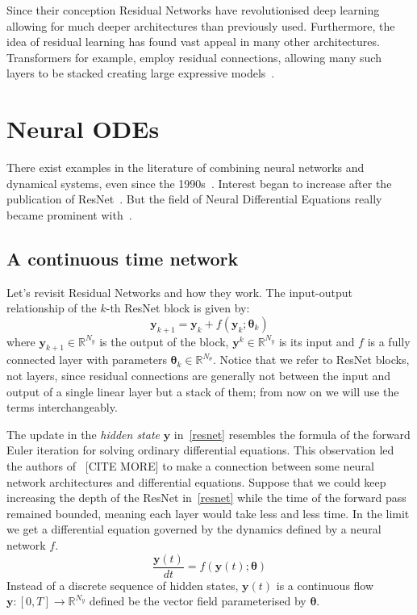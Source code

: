 \documentclass{article}
\begin{document}
    Since their conception Residual Networks have revolutionised deep learning allowing for much deeper architectures than previously used.
    Furthermore, the idea of residual learning has found vast appeal in many other architectures.
    Transformers for example, employ residual connections, allowing many such layers to be stacked creating large expressive models~\cite{vaswani2017attention}.


    \section{Neural ODEs}
    There exist examples in the literature of combining neural networks and dynamical systems, even since the 1990s~\cite{rico1992discrete}.
    Interest began to increase after the publication of ResNet~\cite{weinan2018mean}.
    But the field of Neural Differential Equations really became prominent with~\cite{chen2018neural}.

    \subsection{A continuous time network}
    Let's revisit Residual Networks and how they work.
    The input-output relationship of the $k$-th ResNet block is given by:
    \begin{equation}
        \pmb{y}_{k+1} = \pmb{y}_{k} + f(\pmb{y}_{k}; \pmb{\theta}_k) \label{resnet}
    \end{equation}
    where $\pmb{y}_{k+1} \in \mathbb{R}^{N_y}$ is the output of the block, $\pmb{y}^{k} \in \mathbb{R}^{N_y}$ is its input and $f$ is a fully connected layer with parameters $\pmb{\theta}_k \in \mathbb{R}^{N_\theta}$.
    Notice that we refer to ResNet blocks, not layers, since residual connections are generally not between the input and output of a single linear layer but a stack of them; from now on we will use the terms interchangeably.

    The update in the \textit{hidden state} $\pmb{y}$ in~\eqref{resnet} resembles the formula of the forward Euler iteration for solving ordinary differential equations.
    This observation led the authors of~\cite{lu2018beyond} [CITE MORE] to make a connection between some neural network architectures and differential equations.
    Suppose that we could keep increasing the depth of the ResNet in~\eqref{resnet} while the time of the forward pass remained bounded, meaning each layer would take less and less time.
    In the limit we get a differential equation governed by the dynamics defined by a neural network $f$.
    \begin{equation}
        \frac{ \pmb{y}(t)}{dt} = f(\pmb{y}(t); \pmb{\theta}) \label{diffeq}
    \end{equation}
    Instead of a discrete sequence of hidden states, $\pmb{y}(t)$ is a continuous flow $\pmb{y} : [0,T] \to \mathbb{R}^{N_y}$ defined be the vector field parameterised by $\pmb{\theta}$.
\end{document}
